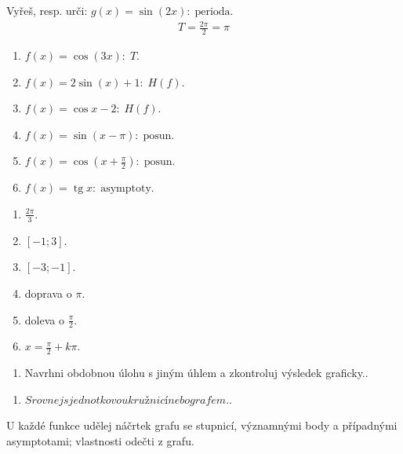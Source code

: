 \documentclass[11pt,a4paper]{article}
\begin{document}
\begin{prikladReseniBox}[title={Příklad 2}]
Vyřeš, resp. urči: $g(x)=\sin(2x):\;\text{perioda}$.
\tcblower
\[\begin{aligned}T=\frac{2\pi}{2}=\pi\end{aligned}\]
\end{prikladReseniBox}
\begin{zadaniReseniBox}[title={Samostatná práce 1}]
\begin{enumerate}[label=\alph*)]
\item $f(x)=\cos(3x):\;T$.
\item $f(x)=2\sin(x)+1:\;H(f)$.
\item $f(x)=\cos x-2:\;H(f)$.
\item $f(x)=\sin(x-\pi):\;\text{posun}$.
\item $f(x)=\cos(x+\frac{\pi}{2}):\;\text{posun}$.
\item $f(x)=\operatorname{tg}x:\;\text{asymptoty}$.
\end{enumerate}
\tcblower
\begin{enumerate}[label=\alph*)]
\item $\frac{2\pi}{3}$.
\item $[-1;3]$.
\item $[-3;-1]$.
\item doprava o $\pi$.
\item doleva o $\frac{\pi}{2}$.
\item $x=\frac{\pi}{2}+k\pi$.
\end{enumerate}
\end{zadaniReseniBox}
\begin{zadaniReseniBox}[title={Rozšíření 1}]
\begin{enumerate}[label=\alph*)]
\item Navrhni obdobnou úlohu s jiným úhlem a zkontroluj výsledek graficky..
\end{enumerate}
\tcblower
\begin{enumerate}[label=\alph*)]
\item $Srovnej s jednotkovou kružnicí nebo grafem.$.
\end{enumerate}
\end{zadaniReseniBox}
U každé funkce udělej náčrtek grafu se stupnicí, významnými body a případnými asymptotami; vlastnosti odečti z grafu.
\end{document}
